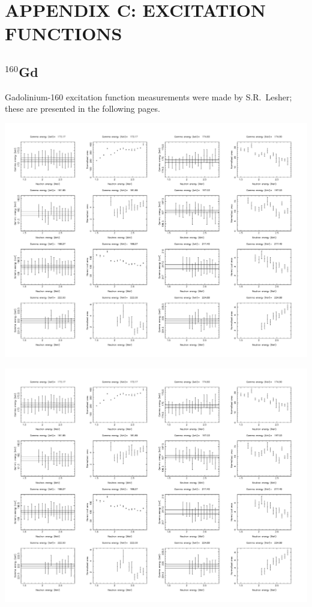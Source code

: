 \chapter{APPENDIX C: EXCITATION FUNCTIONS}
\section{$^{160}$Gd}\label{app:EXF_Gd}
Gadolinium-160 excitation function measurements were made by S.R.~Lesher; these are presented in the following pages.
\begin{center}
\includegraphics[page=1,angle=90,height=0.95\textheight]{160Gd_ExF_full.pdf}
\end{center}
\begin{center}
\includegraphics[page=2,angle=90,height=0.95\textheight]{160Gd_ExF_full.pdf}
\end{center}
